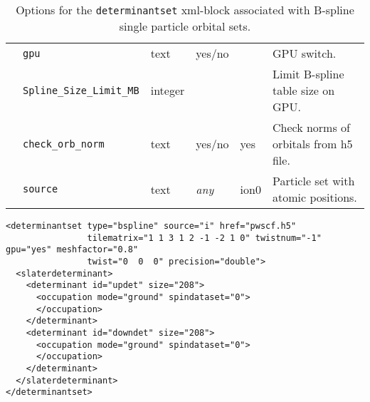 \begin{table}[h]
\begin{center}
\begin{tabularx}{\textwidth}{l l l l l l }
   &   \texttt{gpu}                     &  text              &  yes/no          &                   &  GPU switch. \\
   &   \texttt{Spline\_Size\_Limit\_MB} &  integer           &                  &                   &  Limit B-spline table size on GPU. \\
   &   \texttt{check\_orb\_norm}        &  text              &  yes/no          &  yes              &  Check norms of orbitals from h5 file. \\
   &   \texttt{source}                  &  text              &  \textit{any}    &  ion0             &  Particle set with atomic positions. \\
  \hline
\end{tabularx}
\end{center}
\caption{Options for the \texttt{determinantset} xml-block associated with B-spline single particle orbital sets.}
\label{table:splineSPOs}
\end{table}


\begin{lstlisting}[caption=Determinant set XML element.\label{listing:splineSPOs}]
<determinantset type="bspline" source="i" href="pwscf.h5"
                tilematrix="1 1 3 1 2 -1 -2 1 0" twistnum="-1" gpu="yes" meshfactor="0.8"
                twist="0  0  0" precision="double">
  <slaterdeterminant>
    <determinant id="updet" size="208">
      <occupation mode="ground" spindataset="0">
      </occupation>
    </determinant>
    <determinant id="downdet" size="208">
      <occupation mode="ground" spindataset="0">
      </occupation>
    </determinant>
  </slaterdeterminant>
</determinantset>
\end{lstlisting}

